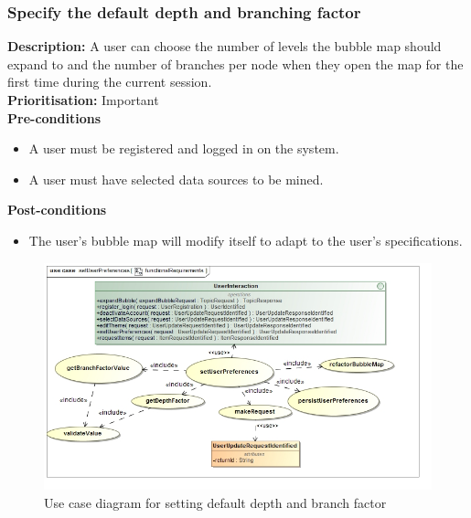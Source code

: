 \documentclass[hidelinks,english]{article}
\begin{document}
    		\subsubsection{Specify the default depth and branching factor}
				\textbf{Description:}  A user can choose the number of levels the bubble map should expand to and the number of branches per node when they open the map for the first time during the current session.\\
			    \textbf{Prioritisation:} Important\\
      			\textbf{Pre-conditions}
			    \begin{itemize}
			        \item A user must be registered and logged in on the system.
			        \item A user must have selected data sources to be mined.
			    \end{itemize}
    			\textbf{Post-conditions}
     			\begin{itemize}
        			\item The user's bubble map will modify itself to adapt to the user's specifications.
    			\end{itemize}
    			
    			\begin{figure}[!h]
    			\includegraphics[width=\linewidth]{setUserPreferencesFunctionalRequirements.jpg}
    			\caption{Use case diagram for setting default depth and branch factor}
    			\label{UseCaseDefaultFactors}
    			\end{figure}
    			
\end{document}
